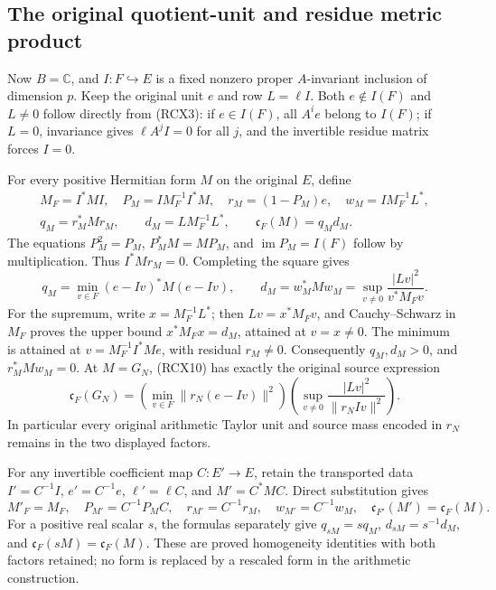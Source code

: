\subsection{The original quotient-unit and residue metric product}

Now \(B=\mathbb C\), and \(I:F\hookrightarrow E\) is a fixed
nonzero proper \(A\)-invariant inclusion of dimension \(p\). Keep the
original unit \(e\) and row \(L=\ell I\). Both \(e\notin I(F)\)
and \(L\ne0\) follow directly from (RCX3): if \(e\in I(F)\), all
\(A^ie\) belong to \(I(F)\); if \(L=0\), invariance gives
\(\ell A^j I=0\) for all \(j\), and the invertible residue matrix
forces \(I=0\).

For every positive Hermitian form \(M\) on the original \(E\), define
\[
\begin{gathered}
 M_F=I^*MI,\quad P_M=I M_F^{-1}I^*M,\quad
 r_M=(1-P_M)e,\quad w_M=I M_F^{-1}L^*,\\
 q_M=r_M^*Mr_M,\qquad d_M=L M_F^{-1}L^*,\qquad
 \mathfrak c_F(M)=q_Md_M .
\end{gathered}\tag{RCX9}
\]
The equations \(P_M^2=P_M\), \(P_M^*M=MP_M\), and
\(\operatorname{im}P_M=I(F)\) follow by multiplication.
Thus \(I^*Mr_M=0\). Completing the square gives
\[
 q_M=\min_{v\in F}(e-Iv)^*M(e-Iv),\qquad
 d_M=w_M^*Mw_M
     =\sup_{v\ne0}\frac{|Lv|^2}{v^*M_Fv}.
 \tag{RCX10}
\]
For the supremum, write \(x=M_F^{-1}L^*\); then
\(Lv=x^*M_Fv\), and Cauchy--Schwarz in \(M_F\) proves the upper
bound \(x^*M_Fx=d_M\), attained at \(v=x\ne0\).
The minimum is attained at \(v=M_F^{-1}I^*Me\), with residual
\(r_M\ne0\). Consequently \(q_M,d_M>0\), and
\(r_M^*Mw_M=0\).
At \(M=G_N\), (RCX10) has exactly the original source expression
\[
 \mathfrak c_F(G_N)=
 \left(\min_{v\in F}\|r_N(e-Iv)\|^2\right)
 \left(\sup_{v\ne0}\frac{|Lv|^2}{\|r_NIv\|^2}\right).
 \tag{RCX11}
\]
In particular every original arithmetic Taylor unit and source mass
encoded in \(r_N\) remains in the two displayed factors.

For any invertible coefficient map \(C:E'\to E\), retain the transported
data \(I'=C^{-1}I\), \(e'=C^{-1}e\),
\(\ell'=\ell C\), and \(M'=C^*MC\). Direct substitution gives
\[
 M'_F=M_F,\quad P_{M'}=C^{-1}P_MC,\quad
 r_{M'}=C^{-1}r_M,\quad w_{M'}=C^{-1}w_M,\quad
 \mathfrak c_{F'}(M')=\mathfrak c_F(M).
 \tag{RCX12}
\]
For a positive real scalar \(s\), the formulas separately give
\(q_{sM}=s q_M\), \(d_{sM}=s^{-1}d_M\), and
\(\mathfrak c_F(sM)=\mathfrak c_F(M)\). These are proved
homogeneity identities with both factors retained; no form is replaced
by a rescaled form in the arithmetic construction.

